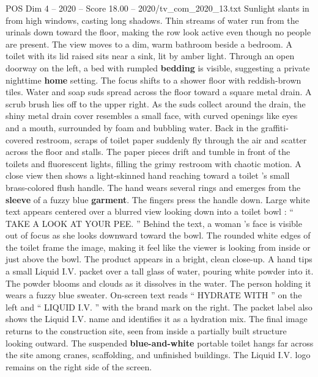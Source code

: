 \begin{textsample}{POS Dim 4 – 2020 – Score 18.00 – 2020/tv\_com\_2020\_13.txt}
Sunlight slants in from high windows, casting long shadows.
Thin streams of water run from the urinals down toward the floor, making the row look active even though no people are present.
The view moves to a dim, warm bathroom beside a bedroom.
A toilet with its lid raised sits near a sink, lit by amber light.
Through an open doorway on the left, a bed with rumpled \textbf{bedding} is visible, suggesting a private nighttime \textbf{home} setting.
The focus shifts to a shower floor with reddish-brown tiles.
Water and soap suds spread across the floor toward a square metal drain.
A scrub brush lies off to the upper right.
As the suds collect around the drain, the shiny metal drain cover resembles a small face, with curved openings like eyes and a mouth, surrounded by foam and bubbling water.
Back in the graffiti-covered restroom, scraps of toilet paper suddenly fly through the air and scatter across the floor and stalls.
The paper pieces drift and tumble in front of the toilets and fluorescent lights, filling the grimy restroom with chaotic motion.
A close view then shows a light-skinned hand reaching toward a toilet ’s small brass-colored flush handle.
The hand wears several rings and emerges from the \textbf{sleeve} of a fuzzy blue \textbf{garment}.
The fingers press the handle down.
Large white text appears centered over a blurred view looking down into a toilet bowl : “ TAKE A LOOK AT YOUR PEE. ” Behind the text, a woman ’s face is visible out of focus as she looks downward toward the bowl.
The rounded white edges of the toilet frame the image, making it feel like the viewer is looking from inside or just above the bowl.
The product appears in a bright, clean close-up.
A hand tips a small Liquid I.V. packet over a tall glass of water, pouring white powder into it.
The powder blooms and clouds as it dissolves in the water.
The person holding it wears a fuzzy blue sweater.
On-screen text reads “ HYDRATE WITH ” on the left and “ LIQUID I.V. ” with the brand mark on the right.
The packet label also shows the Liquid I.V. name and identifies it as a hydration mix.
The final image returns to the construction site, seen from inside a partially built structure looking outward.
The suspended \textbf{blue-and-white} portable toilet hangs far across the site among cranes, scaffolding, and unfinished buildings.
The Liquid I.V. logo remains on the right side of the screen.

\end{textsample}
